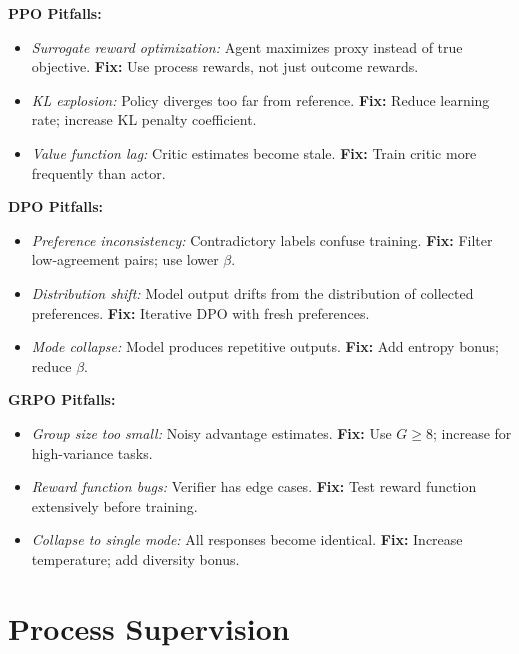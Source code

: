\documentclass[12pt,a4paper]{report}
\theoremstyle{definition}
\begin{document}
\begin{tcolorbox}[colback=red!5!white, colframe=red!70!black, title=\textbf{Common Pitfalls in RL-Based Agent Training}]
\small
\textbf{PPO Pitfalls:}
\begin{itemize}[nosep,leftmargin=*]
    \item \textit{Surrogate reward optimization:} Agent maximizes proxy instead of true objective. \textbf{Fix:} Use process rewards, not just outcome rewards.
    \item \textit{KL explosion:} Policy diverges too far from reference. \textbf{Fix:} Reduce learning rate; increase KL penalty coefficient.
    \item \textit{Value function lag:} Critic estimates become stale. \textbf{Fix:} Train critic more frequently than actor.
\end{itemize}

\textbf{DPO Pitfalls:}
\begin{itemize}[nosep,leftmargin=*]
    \item \textit{Preference inconsistency:} Contradictory labels confuse training. \textbf{Fix:} Filter low-agreement pairs; use lower $\beta$.
    \item \textit{Distribution shift:} Model output drifts from the distribution of collected preferences.
 \textbf{Fix:} Iterative DPO with fresh preferences.
    \item \textit{Mode collapse:} Model produces repetitive outputs. \textbf{Fix:} Add entropy bonus; reduce $\beta$.
\end{itemize}

\textbf{GRPO Pitfalls:}
\begin{itemize}[nosep,leftmargin=*]
    \item \textit{Group size too small:} Noisy advantage estimates. \textbf{Fix:} Use $G \geq 8$; increase for high-variance tasks.
    \item \textit{Reward function bugs:} Verifier has edge cases. \textbf{Fix:} Test reward function extensively before training.
    \item \textit{Collapse to single mode:} All responses become identical. \textbf{Fix:} Increase temperature; add diversity bonus.
\end{itemize}
\end{tcolorbox}

\section{Process Supervision}
\end{document}
